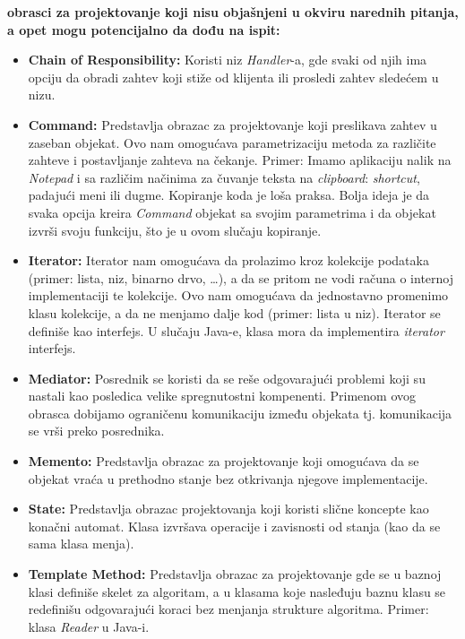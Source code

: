 \documentclass[a4paper]{article}
\begin{document}
  \textbf{obrasci za projektovanje koji nisu objašnjeni u okviru narednih pitanja, a opet mogu potencijalno da
          dođu na ispit:}
  \begin{itemize}
    \item \textbf{Chain of Responsibility:} Koristi niz \textit{Handler}-a, gde svaki od njih
          ima opciju da obradi zahtev koji stiže od klijenta ili prosledi zahtev sledećem u nizu.
    \item \textbf{Command:} Predstavlja obrazac za projektovanje koji preslikava zahtev u zaseban 
          objekat. Ovo nam omogućava parametrizaciju metoda za različite zahteve i postavljanje
          zahteva na čekanje. Primer: Imamo aplikaciju nalik na \textit{Notepad} i sa različim
          načinima za čuvanje teksta na \textit{clipboard}: \textit{shortcut}, padajući meni
          ili dugme. Kopiranje koda je loša praksa. Bolja ideja je da svaka opcija kreira
          \textit{Command} objekat sa svojim parametrima i da objekat izvrši svoju funkciju,
          što je u ovom slučaju kopiranje.
    \item \textbf{Iterator:} Iterator nam omogućava da prolazimo kroz kolekcije podataka (primer:
          lista, niz, binarno drvo, \dots), a da se pritom ne vodi računa o internoj implementaciji
          te kolekcije. Ovo nam omogućava da jednostavno promenimo klasu kolekcije, a da ne menjamo
          dalje kod (primer: lista u niz). Iterator se definiše kao interfejs. U slučaju Java-e,
          klasa mora da implementira \textit{iterator} interfejs.
    \item \textbf{Mediator:} Posrednik se koristi da se reše odgovarajući problemi koji su nastali
          kao posledica velike spregnutostni kompenenti. Primenom ovog obrasca dobijamo ograničenu
          komunikaciju između objekata tj. komunikacija se vrši preko posrednika.
    \item \textbf{Memento:} Predstavlja obrazac za projektovanje koji omogućava da se objekat vraća
          u prethodno stanje bez otkrivanja njegove implementacije.
    \item \textbf{State:} Predstavlja obrazac projektovanja koji koristi slične koncepte kao konačni automat. Klasa
          izvršava operacije i zavisnosti od stanja (kao da se sama klasa menja). 
    \item \textbf{Template Method:} Predstavlja obrazac za projektovanje gde se u baznoj klasi
          definiše skelet za algoritam, a u klasama koje nasleđuju baznu klasu se redefinišu
          odgovarajući koraci bez menjanja strukture algoritma. Primer: klasa \textit{Reader}
          u Java-i.
  \end{itemize}
\end{document}
